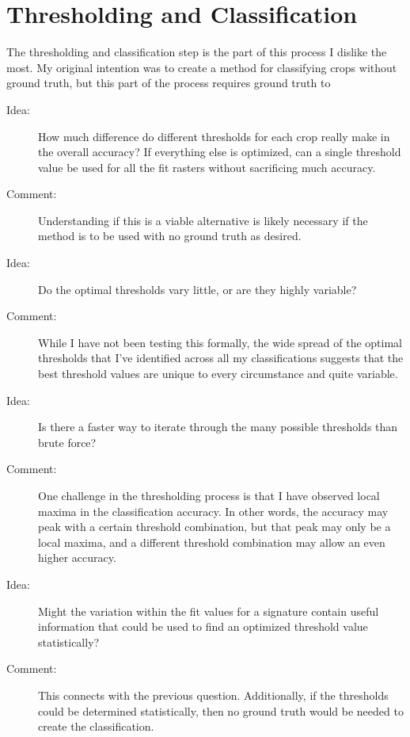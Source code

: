 \section{Thresholding and Classification}

The thresholding and classification step is the part of this process I dislike the most. My original intention was to create a method for classifying crops without ground truth, but this part of the process requires ground truth to 

\begin{description}
\item[Idea:] How much difference do different thresholds for each crop really make in the overall accuracy? If everything else is optimized, can a single threshold value be used for all the fit rasters without sacrificing much accuracy.

\item[Comment:] Understanding if this is a viable alternative is likely necessary if the method is to be used with no ground truth as desired.

\item[Idea:] Do the optimal thresholds vary little, or are they highly variable?

\item[Comment:] While I have not been testing this formally, the wide spread of the optimal thresholds that I’ve identified across all my classifications suggests that the best threshold values are unique to every circumstance and quite variable.

\item[Idea:] Is there a faster way to iterate through the many possible thresholds than brute force?

\item[Comment:] One challenge in the thresholding process is that I have observed local maxima in the classification accuracy. In other words, the accuracy may peak with a certain threshold combination, but that peak may only be a local maxima, and a different threshold combination may allow an even higher accuracy.

\item[Idea:] Might the variation within the fit values for a signature contain useful information that could be used to find an optimized threshold value statistically?

\item[Comment:] This connects with the previous question. Additionally, if the thresholds could be determined statistically, then no ground truth would be needed to create the classification.


\end{description}
